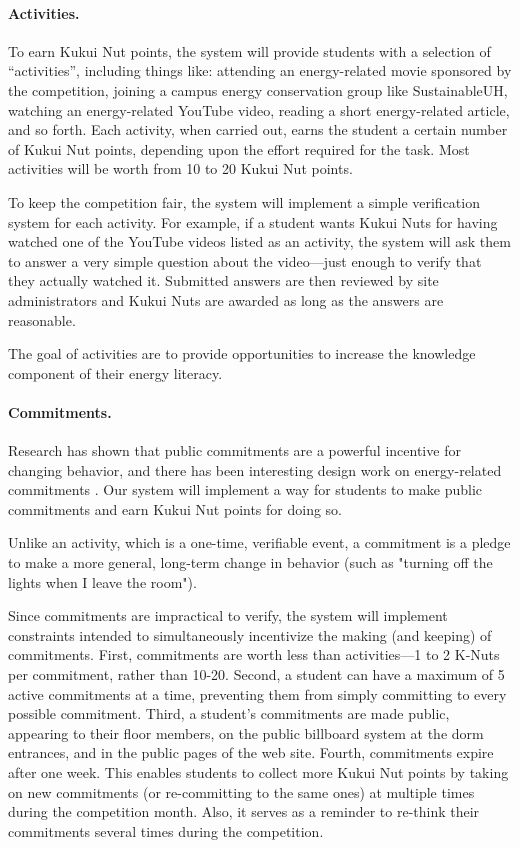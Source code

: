 \documentclass[11pt]{article}
\begin{document}
\paragraph{Activities.}  To earn Kukui Nut
points, the system will provide students with a selection of
``activities'', including things like: attending an energy-related movie
sponsored by the competition, joining a campus energy conservation group
like SustainableUH, watching an energy-related YouTube video, reading a
short energy-related article, and so forth.  Each activity, when carried
out, earns the student a certain number of Kukui Nut points, depending upon
the effort required for the task.  Most activities will be worth from 10 to
20 Kukui Nut points.

To keep the competition fair, the system will implement a simple
verification system for each activity.  For example, if a student wants
Kukui Nuts for having watched one of the YouTube videos listed as an
activity, the system will ask them to answer a very simple question about
the video---just enough to verify that they actually watched it.  Submitted
answers are then reviewed by site administrators and Kukui Nuts are awarded
as long as the answers are reasonable.

The goal of activities are to provide opportunities to increase
the knowledge component of their energy literacy.

\paragraph{Commitments.}  Research has shown
that public commitments are a powerful incentive for changing behavior, and
there has been interesting design work on energy-related commitments
\cite{Pierce09,StepGreen}.  Our system will implement a way for students to
make public commitments and earn Kukui Nut points for doing so.

Unlike an activity, which is a one-time, verifiable event, a commitment is
a pledge to make a more general, long-term change in behavior (such as "turning off
the lights when I leave the room").

Since commitments are impractical to verify, the system will implement
constraints intended to simultaneously incentivize the making (and keeping)
of commitments.  First, commitments are worth less than activities---1 to 2
K-Nuts per commitment, rather than 10-20.  Second, a student can have a
maximum of 5 active commitments at a time, preventing them from simply
committing to every possible commitment.  Third, a student's commitments
are made public, appearing to their floor members, on the public billboard
system at the dorm entrances, and in the public pages of the web site.
Fourth, commitments expire after one week.  This enables students to
collect more Kukui Nut points by taking on new commitments (or
re-committing to the same ones) at multiple times during the competition
month.  Also, it serves as a reminder to re-think their commitments several
times during the competition.
\end{document}
